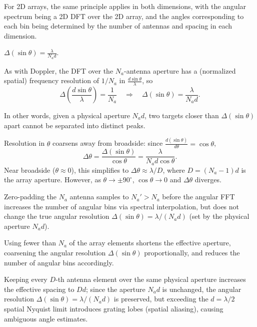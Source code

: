 \begin{remark}[2D Arrays]
For 2D arrays, the same principle applies in both dimensions, with the angular spectrum being a 2D DFT over the 2D array, and the angles corresponding to each bin being determined by the number of antennas and spacing in each dimension.
\end{remark}

\begin{definition}
$\Delta(\sin\theta) = \frac{\lambda}{N_ad}$.
\end{definition}
As with Doppler, the DFT over the $N_a$-antenna aperture has a (normalized spatial) frequency resolution of $1/N_a$ in $\frac{d\sin\theta}{\lambda}$, so
$$\Delta\left(\frac{d\sin\theta}{\lambda}\right) = \frac{1}{N_a} \quad\Longrightarrow\quad \Delta(\sin\theta) = \frac{\lambda}{N_ad}.$$

In other words, given a physical aperture $N_ad$, two targets closer than $\Delta(\sin\theta)$ apart cannot be separated into distinct peaks.

\begin{remark}
Resolution in $\theta$ coarsens away from broadside: since $\frac{d(\sin\theta)}{d\theta} = \cos\theta$,
$$\Delta\theta = \frac{\Delta(\sin\theta)}{\cos\theta} = \frac{\lambda}{N_ad\cos\theta}.$$
Near broadside ($\theta \approx 0$), this simplifies to $\Delta\theta \approx \lambda/D$, where $D = (N_a-1)d$ is the array aperture. However, as $\theta \to \pm 90^\circ$, $\cos\theta \to 0$ and $\Delta\theta$ diverges.
\end{remark}

\begin{remark}[Padding]
Zero-padding the $N_a$ antenna samples to $N_a' > N_a$ before the angular FFT increases the number of angular bins via spectral interpolation, but does not change the true angular resolution $\Delta(\sin\theta) = \lambda/(N_ad)$ (set by the physical aperture $N_ad$).
\end{remark}

\begin{remark}[Cropping]
Using fewer than $N_a$ of the array elements shortens the effective aperture, coarsening the angular resolution $\Delta(\sin\theta)$ proportionally, and reduces the number of angular bins accordingly.
\end{remark}

\begin{remark}[Decimation]
Keeping every $D$-th antenna element over the same physical aperture increases the effective spacing to $Dd$; since the aperture $N_ad$ is unchanged, the angular resolution $\Delta(\sin\theta) = \lambda/(N_ad)$ is preserved, but exceeding the $d = \lambda/2$ spatial Nyquist limit introduces grating lobes (spatial aliasing), causing ambiguous angle estimates.
\end{remark}
